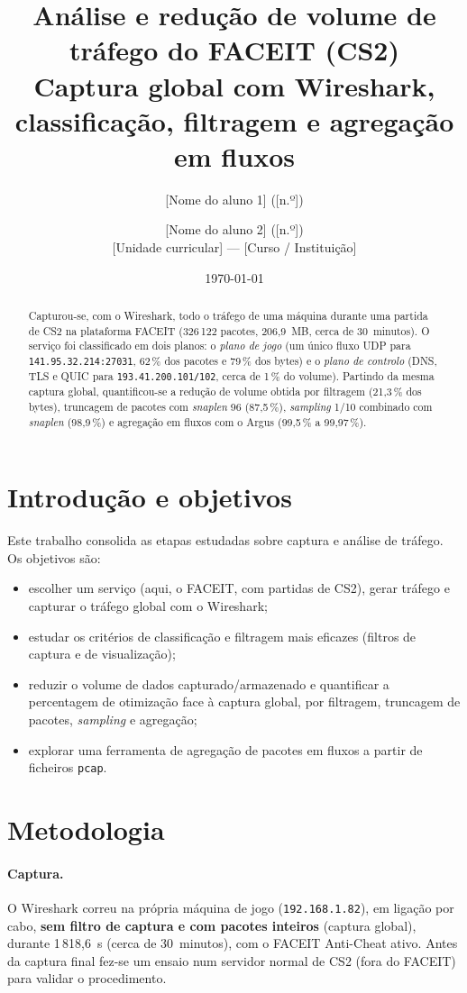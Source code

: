 \documentclass[a4paper,11pt]{article}
\title{Análise e redução de volume de tráfego do FACEIT (CS2)\\[0.3em]
\large Captura global com Wireshark, classificação, filtragem e agregação em fluxos}
\author{[Nome do aluno 1] ([n.º]) \and [Nome do aluno 2] ([n.º])\\[0.3em]
[Unidade curricular] --- [Curso / Instituição]}
\date{\today}
\begin{document}
\maketitle

\begin{abstract}
\noindent
Capturou-se, com o Wireshark, todo o tráfego de uma máquina durante uma partida de CS2 na plataforma FACEIT
(326\,122 pacotes, 206,9~MB, cerca de 30~minutos). O serviço foi classificado em dois planos: o \emph{plano de jogo}
(um único fluxo UDP para \texttt{141.95.32.214:27031}, 62\,\% dos pacotes e 79\,\% dos bytes) e o
\emph{plano de controlo} (DNS, TLS e QUIC para \texttt{193.41.200.101/102}, cerca de 1\,\% do volume).
Partindo da mesma captura global, quantificou-se a redução de volume obtida por filtragem
(21,3\,\% dos bytes), truncagem de pacotes com \emph{snaplen} 96 (87,5\,\%), \emph{sampling} 1/10
combinado com \emph{snaplen} (98,9\,\%) e agregação em fluxos com o Argus (99,5\,\% a 99,97\,\%).
\end{abstract}

\section{Introdução e objetivos}
Este trabalho consolida as etapas estudadas sobre captura e análise de tráfego. Os objetivos são:
\begin{itemize}
  \item escolher um serviço (aqui, o FACEIT, com partidas de CS2), gerar tráfego e capturar o tráfego global com o Wireshark;
  \item estudar os critérios de classificação e filtragem mais eficazes (filtros de captura e de visualização);
  \item reduzir o volume de dados capturado/armazenado e quantificar a percentagem de otimização face à captura global,
        por filtragem, truncagem de pacotes, \emph{sampling} e agregação;
  \item explorar uma ferramenta de agregação de pacotes em fluxos a partir de ficheiros \texttt{pcap}.
\end{itemize}

\section{Metodologia}
\paragraph{Captura.} O Wireshark correu na própria máquina de jogo (\texttt{192.168.1.82}), em ligação por cabo,
\textbf{sem filtro de captura e com pacotes inteiros} (captura global), durante 1\,818,6~s (cerca de 30~minutos),
com o FACEIT Anti-Cheat ativo. Antes da captura final fez-se um ensaio num servidor normal de CS2 (fora do FACEIT)
para validar o procedimento.
\end{document}
